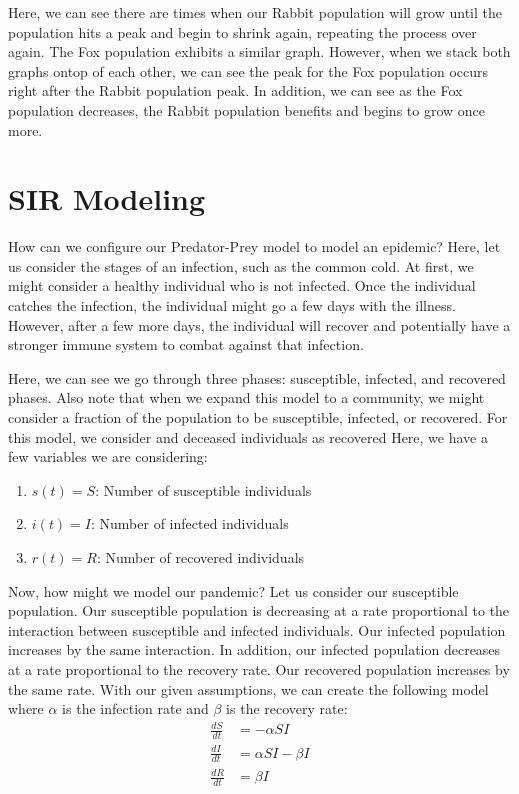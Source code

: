 \documentclass{amsart}
\theoremstyle{definition}
\numberwithin{equation}{section}
\newcommand{\dS}{\frac{dS}{dt}}
\newcommand{\dI}{\frac{dI}{dt}}
\newcommand{\dR}{\frac{dR}{dt}}
\begin{document}
\begin{sansmath}
Here, we can see there are times when our Rabbit population will grow until the population hits a peak and begin to shrink again, repeating the process over again. The Fox population exhibits a similar graph. However, when we stack both graphs ontop of each other, we can see the peak for the Fox population occurs right after the Rabbit population peak. In addition, we can see as the Fox population decreases, the Rabbit population benefits and begins to grow once more.


\section{SIR Modeling}

How can we configure our Predator-Prey model to model an epidemic? Here, let us consider the stages of an infection, such as the common cold. At first, we might consider a healthy individual who is not infected. Once the individual catches the infection, the individual might go a few days with the illness. However, after a few more days, the individual will recover and potentially have a stronger immune system to combat against that infection.

Here, we can see we go through three phases: susceptible, infected, and recovered phases. Also note that when we expand this model to a community, we might consider a fraction of the population to be susceptible, infected, or recovered. For this model, we consider and deceased individuals as recovered Here, we have a few variables we are considering:

\begin{enumerate}
  \item $s(t) = S$: Number of susceptible individuals
  \item $i(t) = I$: Number of infected individuals
  \item $r(t) = R$: Number of recovered individuals
\end{enumerate}

Now, how might we model our pandemic? Let us consider our susceptible population. Our susceptible population is decreasing at a rate proportional to the interaction between susceptible and infected individuals. Our infected population increases by the same interaction. In addition, our infected population decreases at a rate proportional to the recovery rate. Our recovered population increases by the same rate. With our given assumptions, we can create the following model where $\alpha$ is the infection rate and $\beta$ is the recovery rate:
\begin{align*}
  \dS & = -\alpha SI\\
  \dI & = \alpha SI - \beta I\\
  \dR & = \beta I
\end{align*}


\end{sansmath}
\end{document}
